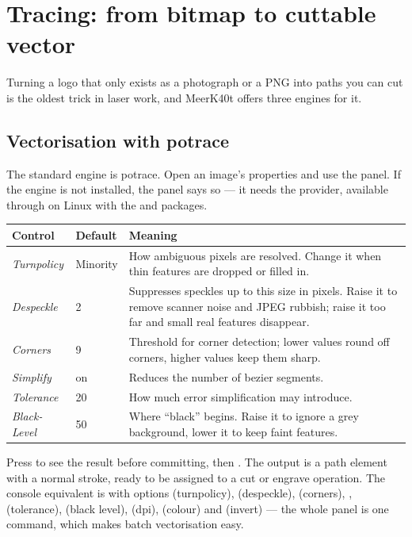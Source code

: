 \section{Tracing: from bitmap to cuttable vector}

Turning a logo that only exists as a photograph or a PNG into paths you can cut is
the oldest trick in laser work, and MeerK40t offers three engines for it.

\subsection*{Vectorisation with potrace}

The standard engine is potrace. Open an image's properties and use the
 panel. If the engine is not installed, the panel says so
--- it needs the  provider, available through
 on Linux with the  and
 packages.

\begin{center}\small
\begin{tabular}{@{}L{3.0cm}L{2.2cm}L{9.0cm}@{}}
\toprule
\textbf{Control} & \textbf{Default} & \textbf{Meaning} \\
\midrule
\emph{Turnpolicy} & Minority & How ambiguous pixels are resolved. Change it when
thin features are dropped or filled in. \\
\emph{Despeckle} & 2 & Suppresses speckles up to this size in pixels. Raise it to
remove scanner noise and JPEG rubbish; raise it too far and small real features
disappear. \\
\emph{Corners} & 9 & Threshold for corner detection; lower values round off
corners, higher values keep them sharp. \\
\emph{Simplify} & on & Reduces the number of bezier segments. \\
\emph{Tolerance} & 20 & How much error simplification may introduce. \\
\emph{Black-Level} & 50 & Where ``black'' begins. Raise it to ignore a grey
background, lower it to keep faint features. \\
\bottomrule
\end{tabular}
\end{center}

\noindent Press  to see the result before committing, then
. The output is a path element with a normal stroke, ready to be
assigned to a cut or engrave operation. The console equivalent is 
with options  (turnpolicy),  (despeckle),  (corners),
,  (tolerance),  (black level),  (dpi),
 (colour) and  (invert) --- the whole panel is one command, which
makes batch vectorisation easy.


